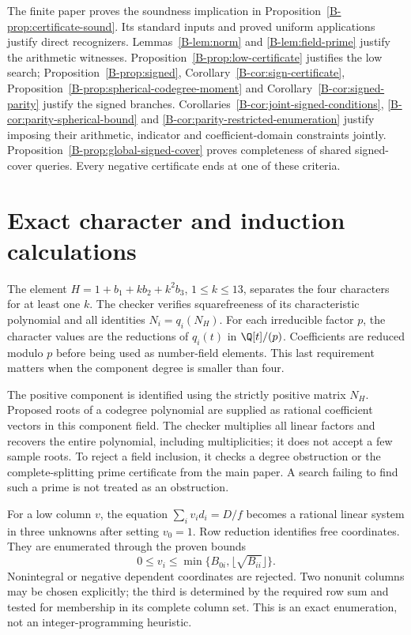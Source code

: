 \documentclass[11pt]{article}
\begin{document}
The finite paper proves the soundness implication in
Proposition~\ref{B-prop:certificate-sound}. Its standard inputs and proved uniform
applications justify direct recognizers. Lemmas~\ref{B-lem:norm} and
\ref{B-lem:field-prime} justify the arithmetic witnesses.
Proposition~\ref{B-prop:low-certificate} justifies the low search;
Proposition~\ref{B-prop:signed}, Corollary~\ref{B-cor:sign-certificate},
Proposition~\ref{B-prop:spherical-codegree-moment} and
Corollary~\ref{B-cor:signed-parity} justify the signed branches.
Corollaries~\ref{B-cor:joint-signed-conditions},
\ref{B-cor:parity-spherical-bound} and
\ref{B-cor:parity-restricted-enumeration} justify imposing their arithmetic,
indicator and coefficient-domain constraints jointly.
Proposition~\ref{B-prop:global-signed-cover} proves completeness of
shared signed-cover queries. Every negative
certificate ends at one of these criteria.

\section{Exact character and induction calculations}
The element $H=1+b_1+kb_2+k^2b_3$, $1\leq k\leq13$, separates the four
characters for at least one $k$. The checker verifies squarefreeness of
its characteristic polynomial and all identities $N_i=q_i(N_H)$.
For each irreducible factor $p$, the character values are the reductions
of $q_i(t)$ in $\Q[t]/(p)$. Coefficients are reduced modulo $p$ before
being used as number-field elements. This last requirement matters when
the component degree is smaller than four.

The positive component is identified using the strictly positive matrix
$N_H$. Proposed roots of a codegree polynomial are supplied as rational
coefficient vectors in this component field. The checker multiplies all
linear factors and recovers the entire polynomial, including multiplicities;
it does not accept a few sample roots. To reject a field inclusion, it
checks a degree obstruction or the complete-splitting prime certificate
from the main paper. A search failing to find such a prime is not treated
as an obstruction.

For a low column $v$, the equation $\sum_i v_id_i=D/f$ becomes a rational
linear system in three unknowns after setting $v_0=1$. Row reduction
identifies free coordinates. They are enumerated through the proven bounds
\[
 0\leq v_i\leq\min\{B_{0i},\lfloor\sqrt{B_{ii}}\rfloor\}.
\]
Nonintegral or negative dependent coordinates are rejected. Two nonunit
columns may be chosen explicitly; the third is determined by the required
row sum and tested for membership in its complete column set. This is an
exact enumeration, not an integer-programming heuristic.
\end{document}
